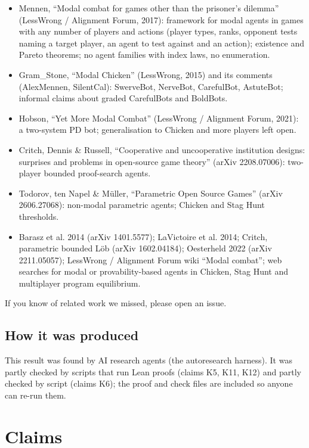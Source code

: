 \documentclass{article}
\begin{document}
\begin{itemize}
\item Mennen, ``Modal combat for games other than the prisoner's dilemma'' (LessWrong / Alignment Forum, 2017): framework for modal agents in games with any number of players and actions (player types, ranks, opponent tests naming a target player, an agent to test against and an action); existence and Pareto theorems; no agent families with index laws, no enumeration.
\item Gram\_Stone, ``Modal Chicken'' (LessWrong, 2015) and its comments (AlexMennen, SilentCal): SwerveBot, NerveBot, CarefulBot, AstuteBot; informal claims about graded CarefulBots and BoldBots.
\item Hobson, ``Yet More Modal Combat'' (LessWrong / Alignment Forum, 2021): a two-system PD bot; generalisation to Chicken and more players left open.
\item Critch, Dennis \& Russell, ``Cooperative and uncooperative institution designs: surprises and problems in open-source game theory'' (arXiv 2208.07006): two-player bounded proof-search agents.
\item Todorov, ten Napel \& Müller, ``Parametric Open Source Games'' (arXiv 2606.27068): non-modal parametric agents; Chicken and Stag Hunt thresholds.
\item Barasz et al. 2014 (arXiv 1401.5577); LaVictoire et al. 2014; Critch, parametric bounded Löb (arXiv 1602.04184); Oesterheld 2022 (arXiv 2211.05057); LessWrong / Alignment Forum wiki ``Modal combat''; web searches for modal or provability-based agents in Chicken, Stag Hunt and multiplayer program equilibrium.
\end{itemize}

If you know of related work we missed, please open an issue.

\subsection*{How it was produced}

This result was found by AI research agents (the autoresearch harness). It was partly checked by scripts that run Lean proofs (claims K5, K11, K12) and partly checked by script (claims K6); the proof and check files are included so anyone can re-run them.

\section{Claims}
\end{document}
